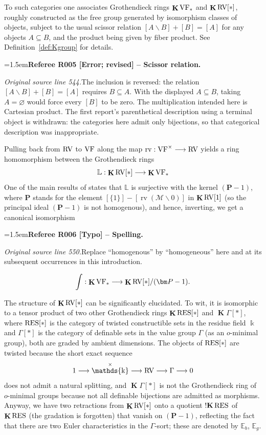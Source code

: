 \documentclass[12pt]{amsart}
\newcommand{\RefereeRemark}[4]{%
  \par\medskip\begingroup\normalfont\small\color{RefereePurple}%
  \emergencystretch=1.5em\noindent\textbf{Referee R#1 [#2] -- #3.}\par\nobreak\noindent #4\par
  \endgroup\medskip
}
\theoremstyle{plain}
\theoremstyle{definition}
\theoremstyle{remark}
\numberwithin{equation}{section}
\theoremstyle{plain}
\newcommand{\VF}{\textup{VF}}
\newcommand{\RV}{\textup{RV}}
\newcommand{\MM}{\mdl M}
\DeclareMathOperator{\K}{\mathds{k}}
\newcommand{\omin}{$o$\nobreakdash}
\newcommand{\0}{\emptyset}
\newcommand{\mdl}[1]{\mathcal{#1}}  %
\newcommand{\bb}[1]{\mathbb{#1}}
\newcommand{\fun}{\longrightarrow}
\newcommand{\sub}{\subseteq}
\newcommand{\mi}{\smallsetminus}
\newcommand{\RES}{\textup{RES}}
\DeclareMathOperator{\rv}{rv}
\DeclareMathOperator{\ggk}{\mathbf{K}}
\DeclareMathOperator{\sggk}{!\mathbf{K}}
\begin{document}
To such categories one associates Grothendieck rings $\ggk\VF_*$ and $\ggk\RV[*]$, roughly constructed as the free group generated by isomorphism classes of objects, subject to the usual scissor relation $[A \mi B] + [B] = [A]$ for any objects $A \sub B$, and the product being given by fiber product. See  Definition~\ref{def:Kgroup} for details.

\RefereeRemark{005}{Error; revised}{Scissor relation}{%
\textit{Original source line 544.}\quad The inclusion is reversed: the relation $[A\mi B]+[B]=[A]$ requires $B\subseteq A$. With the displayed $A\subseteq B$, taking $A=\varnothing$ would force every $[B]$ to be zero. The multiplication intended here is Cartesian product. The first report's parenthetical description using a terminal object is withdrawn: the categories here admit only bijections, so that categorical description was inappropriate.
}

Pulling back from $\RV$ to $\VF$ along the map $\rv: \VF^\times \fun \RV$ yields a ring homomorphism between the   Grothendieck rings
\begin{equation}\label{lifting:hom}
\bb L : \ggk\RV[*] \fun \ggk\VF_*
\end{equation}
One of the  main results of \cite{hrushovski:kazhdan:integration:vf} states that $\bb L$ is surjective with the kernel $(\bm P-1)$, where $\bm P$ stands for the element $[\{1\}] - [\rv(\MM \mi 0)]$  in $\ggk \RV[1]$ (so the principal ideal $(\bm P - 1)$ is not homogenous), and hence, inverting, we get a canonical isomorphism

\RefereeRemark{006}{Typo}{Spelling}{%
\textit{Original source line 550.}\quad Replace ``homogenous'' by ``homogeneous'' here and at its subsequent occurrences in this introduction.
}
\[
\int : \ggk\VF_* \fun \ggk\RV[*]/(\bm P-1).
\]

The structure of $\ggk \RV[*]$ can be significantly elucidated. To wit, it is isomorphic to a tensor product of two other Grothendieck rings $\ggk \RES[*]$ and $\ggk \Gamma[*]$, where  $\RES[*]$ is  the category of twisted constructible sets in the residue field $\K$  and $\Gamma[*]$ is the category of definable sets in the value group $\Gamma$ (as an \omin-minimal group), both are graded by ambient dimensions. The objects of $\RES[*]$ are twisted because the short exact sequence
\[
1 \fun \K^\times \fun \RV \fun \Gamma \fun 0
\]
does not admit a natural splitting, and $\ggk \Gamma[*]$ is not the Grothendieck ring of \omin-minimal groups because not all definable bijections are admitted as morphisms. Anyway, we have two retractions from $\ggk \RV[*]$ onto a quotient $\sggk \RES$ of $\ggk \RES$ (the gradation is forgotten) that vanish on $(\bm P-1)$, reflecting the fact that there are two Euler characteristics in the $\Gamma$-sort; these are denoted by $\bb E_{b}$, $\bb E_{g}$.
\end{document}
